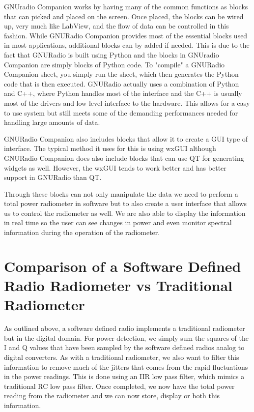 GNUradio Companion works by having many of the common functions as blocks that can picked and placed on the screen.  Once placed, the blocks can be wired up, very much like LabView, and the flow of data can be controlled in this fashion.  While GNURadio Companion provides most of the essential blocks used in most applications, additional blocks can by added if needed.  This is due to the fact that GNURadio is built using Python and the blocks in GNUradio Companion are simply blocks of Python code.  To "compile" a GNURadio Companion sheet, you simply run the sheet, which then generates the Python code that is then executed.  GNURadio actually uses a combination of Python and C++, where Python handles most of the interface and the C++ is usually most of the drivers and low level interface to the hardware.  This allows for a easy to use system but still meets some of the demanding performances needed for handling large amounts of data.  

GNURadio Companion also includes blocks that allow it to create a GUI type of interface.  The typical method it uses for this is using wxGUI although GNURadio Companion does also include blocks that can use QT for generating widgets as well.  However, the wxGUI tends to work better and has better support in GNURadio than QT.  

Through these blocks can not only manipulate the data we need to perform a total power radiometer in software but to also create a user interface that allows us to control the radiometer as well.  We are also able to display the information in real time so the user can see changes in power and even monitor spectral information during the operation of the radiometer. 

\section{Comparison of a Software Defined Radio Radiometer vs Traditional Radiometer}

As outlined above, a software defined radio implements a traditional radiometer but in the digital domain.  For power detection, we simply sum the squares of the I and Q values that have been sampled by the software defined radios analog to digital converters.  As with a traditional radiometer, we also want to filter this information to remove much of the jitters that comes from the rapid fluctuations in the power readings.  This is done using an IIR low pass filter, which mimics a traditional RC low pass filter.  Once completed, we now have the total power reading from the radiometer and we can now store, display or both this information.  

